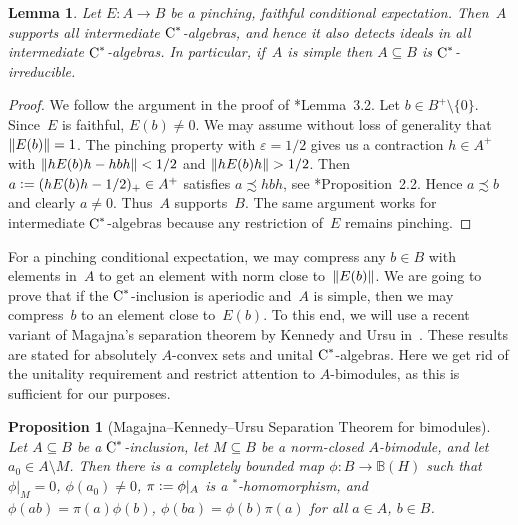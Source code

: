 \documentclass[a4paper]{amsart}
\theoremstyle{plain}
\newtheorem{lemma}[theorem]{Lemma}
\newtheorem{proposition}[theorem]{Proposition}
\theoremstyle{definition}
\theoremstyle{remark}
\numberwithin{theorem}{section}
\numberwithin{equation}{section}
\newcommand*{\nb}{\nobreakdash}
\newcommand*{\Star}{\(^*\)\nobreakdash-}
\newcommand*{\Bound}{\mathbb B}%
\newcommand*{\Cst}{\textup C^*}%
\newcommand*{\defeq}{\mathrel{\vcentcolon=}}%
\DeclarePairedDelimiter{\norm}{\lVert}{\rVert}%
\begin{document}
\begin{lemma}
  \label{lem:pinching_plus_faithful}
  Let \(E\colon A\to B\) be a pinching, faithful conditional expectation.
  Then~\(A\) supports all intermediate \(\Cst\)\nb-algebras, and hence
  it also detects ideals in all intermediate \(\Cst\)\nb-algebras.
  In particular, if~\(A\) is simple then \(A\subseteq B\) is
  \(\Cst\)\nb-irreducible.
\end{lemma}

\begin{proof}
  We follow the argument in the proof of
  \cite{Rordam-Sierakowski:Purely_infinite}*{Lemma~3.2}.
  Let \(b\in B^+\setminus \{0\}\).
  Since~\(E\) is faithful, \(E(b)\neq 0\).
  We may assume without loss of generality that \(\norm{E(b)}=1\).
  The pinching property with \(\varepsilon=1/2\) gives us a
  contraction \(h\in A^+\) with \(\norm{hE(b)h-hbh}<1/2\) and
  \(\norm{hE(b)h} >1/2\).
  Then \(a \defeq(hE(b)h-1/2)_+ \in A^+\) satisfies \(a \precsim
  hbh\), see \cite{Rordam:On_simple_II}*{Proposition~2.2}.
  Hence \(a\precsim b\) and clearly \(a\neq 0\).
  Thus~\(A\) supports~\(B\).
  The same argument works for intermediate \(\Cst\)\nb-algebras
  because any restriction of~\(E\) remains pinching.
\end{proof}

For a pinching conditional expectation, we may compress any \(b\in B\)
with elements in~\(A\) to get an element with norm close
to~\(\norm{E(b)}\).
We are going to prove that if the \(\Cst\)\nb-inclusion is aperiodic
and~\(A\) is simple, then we may compress~\(b\) to an element close
to~\(E(b)\).
To this end, we will use a recent variant of Magajna's separation
theorem by Kennedy and Ursu
in~\cite{Kennedy-Ursu:Intermediate_subalgebras_crossed}.
These results are stated for absolutely \(A\)\nb-convex sets and
unital \(\Cst\)\nb-algebras.
Here we get rid of the unitality requirement and restrict attention to
\(A\)\nb-bimodules, as this is sufficient for our purposes.

\begin{proposition}[Magajna--Kennedy--Ursu Separation Theorem for
  bimodules]
  \label{thm:Magajna_Kennedy_Ursu}
  Let \(A\subseteq B\) be a \(\Cst\)\nb-inclusion, let \(M\subseteq
  B\) be a norm-closed \(A\)-bimodule, and let \(a_0\in A\setminus
  M\).
  Then there is a completely bounded map \(\phi\colon B\to \Bound(H)\)
  such that \(\phi|_M=0\), \(\phi(a_0)\neq 0\), \(\pi\defeq\phi|_A\)
  is a \Star{}homomorphism, and \(\phi(ab)=\pi(a)\phi(b)\),
  \(\phi(ba)=\phi(b)\pi(a)\) for all \(a\in A\), \(b\in B\).
\end{proposition}
\end{document}
